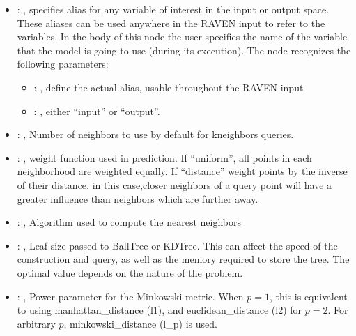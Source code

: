 \begin{itemize}
    \item {}: , 
      specifies alias for         any variable of interest in the input or output space. These
      aliases can be used anywhere in the RAVEN input to         refer to the variables. In the body
      of this node the user specifies the name of the variable that the model is going to use
      (during its execution).
      The  node recognizes the following parameters:
        \begin{itemize}
          \item {}: , 
            define the actual alias, usable throughout the RAVEN input
          \item {}: , 
            either ``input'' or ``output''.
      \end{itemize}

    \item {}: , 
      Number of neighbors to use by default for kneighbors queries.

    \item {}: , 
      weight function used in prediction. If ``uniform'', all points in each neighborhood
      are weighted equally. If ``distance'' weight points by the inverse of their distance. in this
      case,closer neighbors of a query point will have a greater influence than neighbors which are
      further away.

    \item {}: , 
      Algorithm used to compute the nearest neighbors

    \item {}: , 
      Leaf size passed to BallTree or KDTree. This can affect the speed of the construction
      and query, as well as the memory required to store the tree. The optimal value depends on the
      nature of the problem.

    \item {}: , 
      Power parameter for the Minkowski metric. When $p = 1$, this is equivalent to using
      manhattan\_distance (l1), and euclidean\_distance (l2) for $p = 2$. For arbitrary $p$,
      minkowski\_distance                                                  (l\_p) is used.


\end{itemize}
